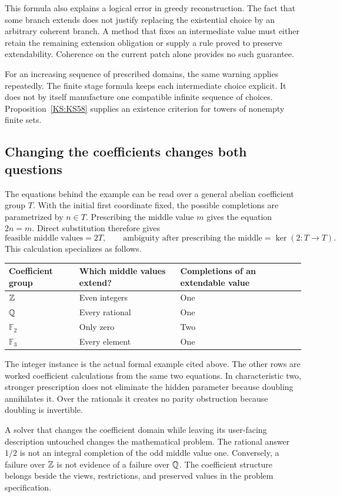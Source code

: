 This formula also explains a logical error in greedy reconstruction. The fact that some branch extends does not justify replacing the existential choice by an arbitrary coherent branch. A method that fixes an intermediate value must either retain the remaining extension obligation or supply a rule proved to preserve extendability. Coherence on the current patch alone provides no such guarantee.

For an increasing sequence of prescribed domains, the same warning applies repeatedly. The finite stage formula keeps each intermediate choice explicit. It does not by itself manufacture one compatible infinite sequence of choices. Proposition~\ref{KS:KS58} supplies an existence criterion for towers of nonempty finite sets.

\subsection{Changing the coefficients changes both questions}
The equations behind the example can be read over a general abelian coefficient group \(T\). With the initial first coordinate fixed, the possible completions are parametrized by \(n\in T\). Prescribing the middle value \(m\) gives the equation \(2n=m\). Direct substitution therefore gives
\[
 \text{feasible middle values}=2T,\qquad
 \text{ambiguity after prescribing the middle}=\ker(2:T\to T).
\]
This calculation specializes as follows.
\begin{center}
\begin{tabular}{@{}lll@{}}
\toprule
Coefficient group & Which middle values extend? & Completions of an extendable value\\
\midrule
\(\mathbb Z\) & Even integers & One\\
\(\mathbb Q\) & Every rational & One\\
\(\mathbb F_2\) & Only zero & Two\\
\(\mathbb F_3\) & Every element & One\\
\bottomrule
\end{tabular}
\end{center}
The integer instance is the actual formal example cited above. The other rows are worked coefficient calculations from the same two equations. In characteristic two, stronger prescription does not eliminate the hidden parameter because doubling annihilates it. Over the rationals it creates no parity obstruction because doubling is invertible.

A solver that changes the coefficient domain while leaving its user-facing description untouched changes the mathematical problem. The rational answer \(1/2\) is not an integral completion of the odd middle value one. Conversely, a failure over \(\mathbb Z\) is not evidence of a failure over \(\mathbb Q\). The coefficient structure belongs beside the views, restrictions, and preserved values in the problem specification.

